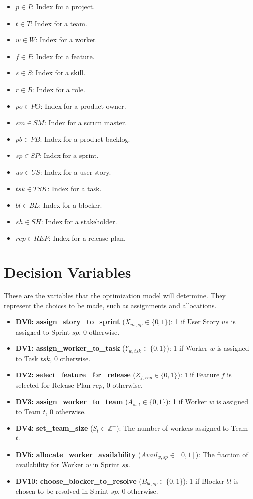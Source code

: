 \documentclass[11pt]{article}
\begin{document}
\begin{itemize}
    \item $p \in P$: Index for a project.
    \item $t \in T$: Index for a team.
    \item $w \in W$: Index for a worker.
    \item $f \in F$: Index for a feature.
    \item $s \in S$: Index for a skill.
    \item $r \in R$: Index for a role.
    \item $po \in PO$: Index for a product owner.
    \item $sm \in SM$: Index for a scrum master.
    \item $pb \in PB$: Index for a product backlog.
    \item $sp \in SP$: Index for a sprint.
    \item $us \in US$: Index for a user story.
    \item $tsk \in TSK$: Index for a task.
    \item $bl \in BL$: Index for a blocker.
    \item $sh \in SH$: Index for a stakeholder.
    \item $rep \in REP$: Index for a release plan.
\end{itemize}

\section{Decision Variables}
These are the variables that the optimization model will determine. They represent the choices to be made, such as assignments and allocations.

\begin{itemize}
    \item \textbf{DV0: assign\_story\_to\_sprint} ($X_{us, sp} \in \{0,1\}$): 1 if User Story $us$ is assigned to Sprint $sp$, 0 otherwise.
    \item \textbf{DV1: assign\_worker\_to\_task} ($Y_{w, tsk} \in \{0,1\}$): 1 if Worker $w$ is assigned to Task $tsk$, 0 otherwise.
    \item \textbf{DV2: select\_feature\_for\_release} ($Z_{f, rep} \in \{0,1\}$): 1 if Feature $f$ is selected for Release Plan $rep$, 0 otherwise.
    \item \textbf{DV3: assign\_worker\_to\_team} ($A_{w, t} \in \{0,1\}$): 1 if Worker $w$ is assigned to Team $t$, 0 otherwise.
    \item \textbf{DV4: set\_team\_size} ($S_t \in \mathbb{Z}^+$): The number of workers assigned to Team $t$.
    \item \textbf{DV5: allocate\_worker\_availability} ($Avail_{w, sp} \in [0,1]$): The fraction of availability for Worker $w$ in Sprint $sp$.
    \item \textbf{DV10: choose\_blocker\_to\_resolve} ($B_{bl, sp} \in \{0,1\}$): 1 if Blocker $bl$ is chosen to be resolved in Sprint $sp$, 0 otherwise.
\end{itemize}
\end{document}
